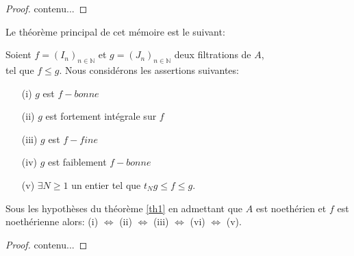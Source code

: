 \begin{proof}
	contenu...
\end{proof}
Le théorème principal de cet mémoire est le suivant:\\
\begin{montheoreme}
	\label{th1}
	Soient $f=(I_n)_{n \in \mathbb{N}}$ et $g=(J_n)_{n \in \mathbb{N}}$ deux filtrations de $A$,\\ tel que $f \leqslant  g$. Nous considérons les assertions suivantes:\\
	\begin{enumerate}
		
		\item[(i)] $g$ est $f-bonne$

		\item[(ii)] $g$ est fortement intégrale sur $f$
		
		\item[(iii)] $g$ est $f-fine$
		
		\item[(iv)] $g$ est faiblement $f-bonne$
		
		\item[(v)]  $\exists N \geqslant 1$ un entier tel que $t_Ng \leqslant f \leqslant g$.
	\end{enumerate}
\end{montheoreme}
\begin{maproposition}
	Sous les hypothèses du théorème \eqref{th1} en admettant que $A$ est noethérien
	et $f$ est noethérienne alors:
	(i) $\Longleftrightarrow $ (ii) $\Longleftrightarrow $ (iii) $\Longleftrightarrow $ (vi) $\Longleftrightarrow $ (v). 
\end{maproposition}
\begin{proof}
	contenu...
\end{proof}

